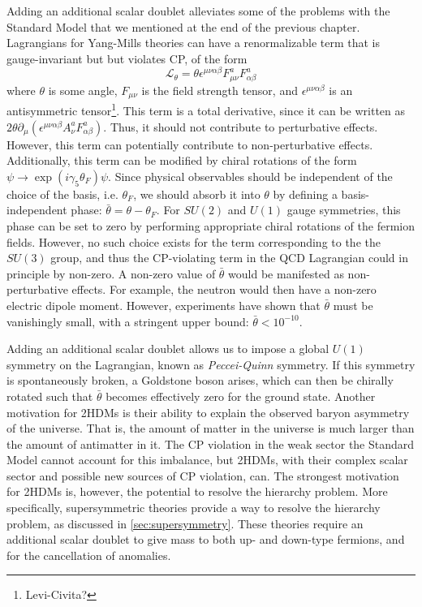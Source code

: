 Adding an additional scalar doublet alleviates some of the problems with the Standard Model that we mentioned at the end of the previous chapter. 
Lagrangians for Yang-Mills theories can have a renormalizable term that is gauge-invariant but but violates CP, of the form
\[\mathcal{L}_{\theta} = \theta\epsilon^{\mu\nu\alpha\beta}F_{\mu\nu}^aF_{\alpha\beta}^a\]
where $\theta$ is some angle, $F_{\mu\nu}$ is the field strength tensor, and $\epsilon^{\mu\nu\alpha\beta}$ is an antisymmetric tensor\footnote{Levi-Civita?}. This term is a total derivative, since it can be written as $2\theta\partial_\mu(\epsilon^{\mu\nu\alpha\beta}A_\nu^aF_{\alpha\beta}^a)$. Thus, it should not contribute to perturbative effects. However, this term can potentially contribute to non-perturbative effects. Additionally, this term can be modified by chiral rotations of the form $\psi\rightarrow \exp(i\gamma_5\theta_F)\psi$. Since physical observables should be independent of the choice of the basis, i.e. $\theta_F$, we should absorb it into $\theta$ by defining a basis-independent phase: $\bar{\theta} = \theta-\theta_F$. For $SU(2)$ and $U(1)$ gauge symmetries, this phase can be set to zero by performing appropriate chiral rotations of the fermion fields. However, no such choice exists for the term corresponding to the the $SU(3)$ group, and thus the CP-violating term in the QCD Lagrangian could in principle by non-zero. A non-zero value of $\bar{\theta}$ would be manifested as non-perturbative effects. For example, the neutron would then have a non-zero electric dipole moment. However, experiments have shown that $\bar{\theta}$ must be vanishingly small, with a stringent upper bound: $\bar{\theta}<10^{-10}$.

Adding an additional scalar doublet allows us to impose a global $U(1)$ symmetry on the Lagrangian, known as \emph{Peccei-Quinn} symmetry. If this symmetry is spontaneously broken, a Goldstone boson arises, which can then be chirally rotated such that $\bar{\theta}$ becomes effectively zero for the ground state.
Another motivation for 2HDMs is their ability to explain the observed baryon asymmetry of the universe. That is, the amount of matter in the universe is much larger than the amount of antimatter in it. The CP violation in the weak sector the Standard Model cannot account for this imbalance, but 2HDMs, with their complex scalar sector and possible new sources of CP violation, can.
%
The strongest motivation for 2HDMs is, however, the potential to resolve the hierarchy problem. More specifically, supersymmetric theories provide a way to resolve the hierarchy problem, as discussed in \autoref{sec:supersymmetry}. These theories require an additional scalar doublet to give mass to both up- and down-type fermions, and for the cancellation of anomalies.

